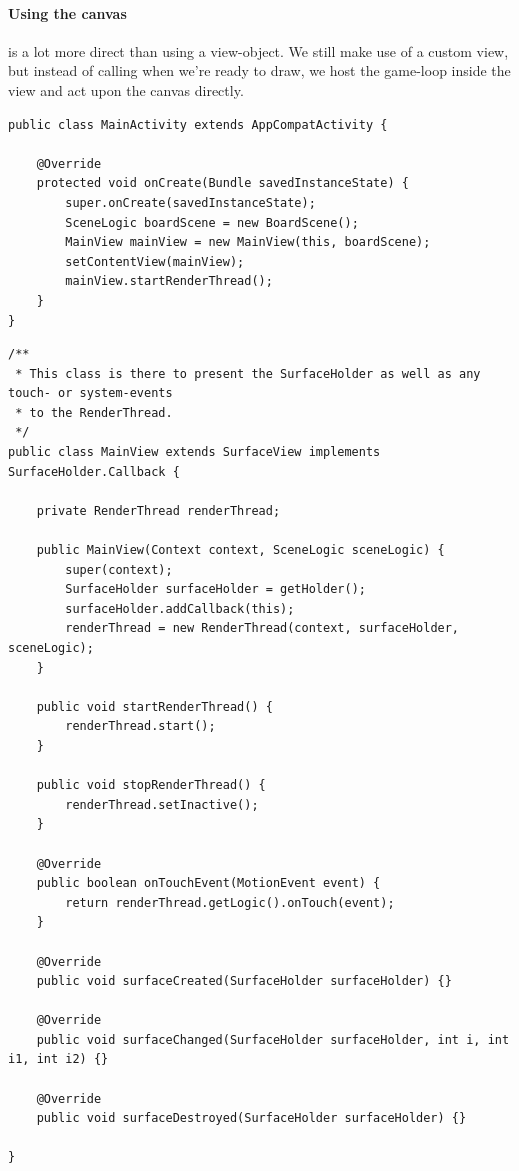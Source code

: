 \paragraph{Using the canvas} is a lot more direct than using a view-object. We still make use of a custom view, but instead of calling  when we're ready to draw, we host the game-loop inside the view and act upon the canvas directly. 

\begin{lstlisting}
public class MainActivity extends AppCompatActivity {

    @Override
    protected void onCreate(Bundle savedInstanceState) {
        super.onCreate(savedInstanceState);
        SceneLogic boardScene = new BoardScene();
        MainView mainView = new MainView(this, boardScene);
        setContentView(mainView);
        mainView.startRenderThread();
    }
}
\end{lstlisting}

\begin{lstlisting}
/**
 * This class is there to present the SurfaceHolder as well as any touch- or system-events
 * to the RenderThread.
 */
public class MainView extends SurfaceView implements SurfaceHolder.Callback {

    private RenderThread renderThread;

    public MainView(Context context, SceneLogic sceneLogic) {
        super(context);
        SurfaceHolder surfaceHolder = getHolder();
        surfaceHolder.addCallback(this);
        renderThread = new RenderThread(context, surfaceHolder, sceneLogic);
    }

    public void startRenderThread() {
        renderThread.start();
    }

    public void stopRenderThread() {
        renderThread.setInactive();
    }

    @Override
    public boolean onTouchEvent(MotionEvent event) {
        return renderThread.getLogic().onTouch(event);
    }

    @Override
    public void surfaceCreated(SurfaceHolder surfaceHolder) {}

    @Override
    public void surfaceChanged(SurfaceHolder surfaceHolder, int i, int i1, int i2) {}

    @Override
    public void surfaceDestroyed(SurfaceHolder surfaceHolder) {}

}
\end{lstlisting}


